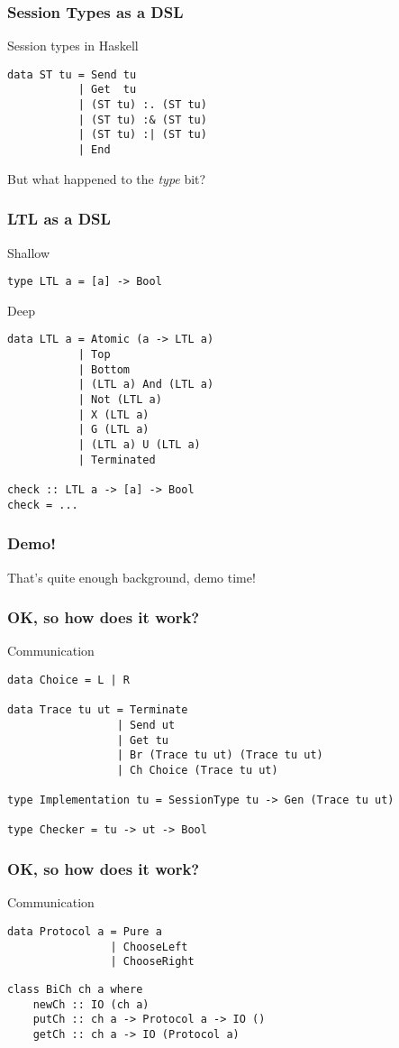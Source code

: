\documentclass{beamer}
\begin{document}
\begin{frame}[fragile]
    \frametitle{Session Types as a DSL}
    \large{Session types in Haskell}
    \\
    \begin{verbatim}
data ST tu = Send tu
           | Get  tu
           | (ST tu) :. (ST tu)
           | (ST tu) :& (ST tu)
           | (ST tu) :| (ST tu)
           | End
    \end{verbatim}
    \pause
    But what happened to the \textit{type} bit?
\end{frame}

\begin{frame}[fragile]
    \frametitle{LTL as a DSL}
    \centering
    Shallow
    \begin{verbatim}
type LTL a = [a] -> Bool
    \end{verbatim}
    \pause
    \centering
    Deep
    \begin{verbatim}
data LTL a = Atomic (a -> LTL a)
           | Top 
           | Bottom
           | (LTL a) And (LTL a)
           | Not (LTL a)
           | X (LTL a)
           | G (LTL a)
           | (LTL a) U (LTL a)
           | Terminated

check :: LTL a -> [a] -> Bool
check = ...
    \end{verbatim}
\end{frame}

\begin{frame}
    \frametitle{Demo!}
    \Large{That's quite enough background, demo time!}
\end{frame}

\begin{frame}[fragile]
    \frametitle{OK, so how does it work?}
    \centering
    \Large{Communication}
    \small{
    \begin{verbatim}
data Choice = L | R

data Trace tu ut = Terminate
                 | Send ut
                 | Get tu
                 | Br (Trace tu ut) (Trace tu ut)
                 | Ch Choice (Trace tu ut)

type Implementation tu = SessionType tu -> Gen (Trace tu ut)

type Checker = tu -> ut -> Bool
    \end{verbatim}
}
\end{frame}

\begin{frame}[fragile]
    \frametitle{OK, so how does it work?}
    \centering
    \Large{Communication}
    \begin{verbatim}
data Protocol a = Pure a
                | ChooseLeft
                | ChooseRight
    \end{verbatim}
    \begin{verbatim}
class BiCh ch a where
    newCh :: IO (ch a)
    putCh :: ch a -> Protocol a -> IO ()
    getCh :: ch a -> IO (Protocol a)
    \end{verbatim}
\end{frame}
\end{document}
